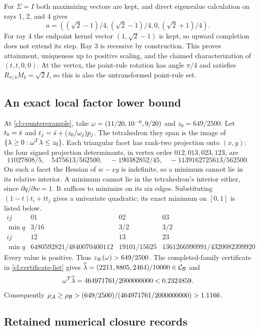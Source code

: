 For $\Sigma=I$ both maximizing vectors are kept, and direct eigenvalue
calculation on rays 1, 2, and 4 gives
\[
 a=\left((\sqrt2-1)/4,(\sqrt2-1)/4,0,(\sqrt2+1)/4\right).
\]
For ray 4 the endpoint kernel vector $(1,\sqrt2-1)$ is kept, so upward
completion does not extend its step. Ray 3 is recessive by construction.
This proves attainment, uniqueness up to positive scaling, and the
claimed characterization of $(t,t,0,0)$.
At the vertex, the point-rule rotation has angle $\pi/4$ and satisfies
$R_{\pi/4}M_b=\sqrt2I$, so this is also the untransformed point-rule set.

\subsection{An exact local factor lower bound}\label{cl:local-factor}

At \cref{cl:counterexample}, take
$\omega=(11/20,10^{-6},9/20)$ and $z_0=649/2500$.
Let $t_0=\bar s$ and $t_j=\bar s+(z_0/\omega_j)p_j$.
The tetrahedron they span is the image of
$\{\lambda\ge0:\omega^T\lambda\le z_0\}$.
Each triangular facet has rank-two projection onto $(x,y)$: the four
signed projection determinants, in vertex order $012,013,023,123$, are
\[
 11027808/5,\quad 5475613/562500,\quad
 -190382852/45,\quad -1139162725613/562500.
\]
On such a facet the Hessian of $w-xy$ is indefinite, so a minimum cannot
lie in its relative interior. A minimum cannot lie in the tetrahedron's
interior either, since $\partial q/\partial w=1$. It suffices to minimize
on its six edges. Substituting $(1-t)t_i+tt_j$ gives a univariate
quadratic; its exact minimum on $[0,1]$ is listed below.
\[
\begin{array}{c|rrr}
 ij&01&02&03\\\hline
 \min q&3/16&3/2&3/2\\\hline
 ij&12&13&23\\\hline
 \min q&6480592821/4840070400112&19101/15625&
 1361266990991/4320082399920
\end{array}
\]
Every value is positive. Thus $z_K(\omega)>649/2500$.
The completed-family certificate in \cref{cl:certificate-list} gives
$\widehat\lambda=(2211,8805,2464)/10000\in\mathcal C_{\mathcal B}$ and
\[
 \omega^T\widehat\lambda=464971761/2000000000<0.2324859.
\]
Consequently
$\rho_{\mathcal A}\ge\rho_{\mathcal B}>
(649/2500)/(464971761/2000000000)>1.1166$.

\subsection{Retained numerical closure records}\label{cl:numerical-records}


